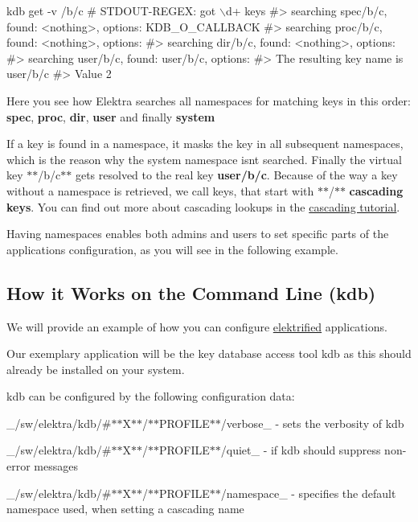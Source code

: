 \begin{DoxyCode}
kdb get -v /b/c
# STDOUT-REGEX: got \(\backslash\)d+ keys
#>  searching spec/b/c, found: <nothing>, options: KDB\_O\_CALLBACK
#>  searching proc/b/c, found: <nothing>, options:
#>  searching dir/b/c, found: <nothing>, options:
#>  searching user/b/c, found: user/b/c, options:
#> The resulting key name is user/b/c
#> Value 2
\end{DoxyCode}


Here you see how Elektra searches all namespaces for matching keys in this order\+: {\bfseries spec}, {\bfseries proc}, {\bfseries dir}, {\bfseries user} and finally {\bfseries system}

If a key is found in a namespace, it masks the key in all subsequent namespaces, which is the reason why the system namespace isn\textquotesingle{}t searched. Finally the virtual key $\ast$$\ast$/b/c$\ast$$\ast$ gets resolved to the real key {\bfseries user/b/c}. Because of the way a key without a namespace is retrieved, we call keys, that start with \textquotesingle{}$\ast$$\ast$/$\ast$$\ast$\textquotesingle{} {\bfseries cascading keys}. You can find out more about cascading lookups in the \hyperlink{doc_tutorials_cascading_md}{cascading tutorial}.

Having namespaces enables both admins and users to set specific parts of the application\textquotesingle{}s configuration, as you will see in the following example.

\subsection*{How it Works on the Command Line (kdb)}

We will provide an example of how you can configure \hyperlink{md_doc_help_elektra-glossary_doc_help_elektra-glossary_md}{elektrified} applications.

Our exemplary application will be the key database access tool {\ttfamily kdb} as this should already be installed on your system.

{\ttfamily kdb} can be configured by the following configuration data\+:


\begin{DoxyItemize}
\item \+\_\+/sw/elektra/kdb/\#$\ast$$\ast$\+X$\ast$$\ast$/$\ast$$\ast$\+P\+R\+O\+F\+I\+L\+E$\ast$$\ast$/verbose\+\_\+ -\/ sets the verbosity of kdb
\item \+\_\+/sw/elektra/kdb/\#$\ast$$\ast$\+X$\ast$$\ast$/$\ast$$\ast$\+P\+R\+O\+F\+I\+L\+E$\ast$$\ast$/quiet\+\_\+ -\/ if kdb should suppress non-\/error messages
\item \+\_\+/sw/elektra/kdb/\#$\ast$$\ast$\+X$\ast$$\ast$/$\ast$$\ast$\+P\+R\+O\+F\+I\+L\+E$\ast$$\ast$/namespace\+\_\+ -\/ specifies the default namespace used, when setting a cascading name
\end{DoxyItemize}

